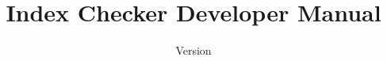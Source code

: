 \documentclass[10pt]{report}
\title{Index Checker Developer Manual}
\date{Version \IndexReleaseInfo{}}
\begin{document}

{\let\newpage\relax \maketitle}



\tableofcontents
\newpage



\htmlhr
%
%
\end{document}
